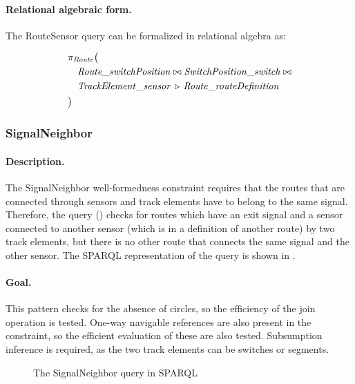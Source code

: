 \paragraph{Relational algebraic form.}  The \textsf{RouteSensor} query can be formalized in relational algebra as:

\begin{align*}
& \pi_{\mathit{Route}} \big( \\
& \quad \mathit{Route\_switchPosition} \bowtie \mathit{SwitchPosition\_switch} \bowtie \\
& \quad \mathit{TrackElement\_sensor} \, \triangleright \, \mathit{Route\_routeDefinition} \\
& \big)
\end{align*}

\subsubsection{SignalNeighbor}

\paragraph{Description.} The \textsf{SignalNeighbor} well-formedness constraint requires that the routes that are connected through sensors and track elements have to belong to the same signal. Therefore, the query () checks for routes which have an exit signal and a sensor connected to another sensor (which is in a definition of another route) by two track elements, but there is no other route that connects the same signal and the other sensor. The SPARQL representation of the query is shown in .

\paragraph{Goal.} This pattern checks for the absence of circles, so the efficiency of the join operation is tested. One-way navigable references are also present in the constraint, so the efficient evaluation of these are also tested. Subsumption inference is required, as the two track elements can be switches or segments.

\begin{figure}[Htb]
\centering
\begin{minipage}{0.6\textwidth}
  { \alignListing
    }
  \caption{The \textsf{SignalNeighbor} query in SPARQL}
  \label{lst:signalneighbor-sparql}
\end{minipage}
\end{figure}


